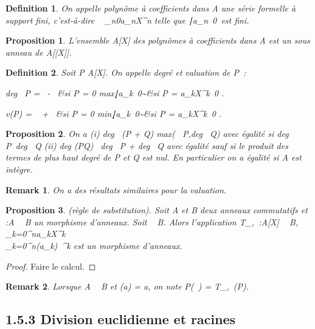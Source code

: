 \documentclass{article}
\newtheorem{definition}{Definition}[section]
\newenvironment{de}
  {\begin{definition}}
  {\end{definition}}
\newtheorem{proposition}{Proposition}[section]
\newenvironment{prop}
  {\begin{proposition}}
  {\end{proposition}}
\newtheorem{remark}{Remark}[section]
\newenvironment{rem}
  {\begin{remark}}
  {\end{remark}}
\begin{document}
\begin{de}
On appelle polynôme à coefficients dans A une série
formelle à support fini, c'est-à-dire
\sum ~
_n\geq0a_nX^n telle que
\n∣a_n\mathrel\neq~0\
est fini.
\end{de}

\begin{prop}
L'ensemble A[X] des polynômes à coefficients dans
A est un sous anneau de A[[X]].
\end{prop}

\begin{de}
Soit P \in A[X]. On appelle degré et valuation de P~:

deg~ P = \left
\ \cases -\infty~ &si P = 0
\cr
max\k∣a_k\mathrel\neq~0\~&si
P = \sum
a_kX^k\neq~0 
\right .

v(P) = \left \ \cases
+\infty~ &si P = 0 \cr
min\k∣a_k\mathrel\neq~0\~&si
P = \sum
a_kX^k\neq~0 
\right .
\end{de}

\begin{prop}
On a (i) deg~ (P + Q)
\leq max(\deg~
P,deg~ Q) avec égalité si
deg~
P\neq~deg~ Q (ii)
deg (PQ) \leq\ deg~ P
+ deg~ Q avec égalité sauf si le produit des
termes de plus haut degré de P et Q est nul. En particulier on a égalité
si A est intègre.
\end{prop}

\begin{rem}
On a des résultats similaires pour la valuation.
\end{rem}

\begin{prop}
(règle de substitution). Soit A et B deux anneaux
commutatifs et \phi:A \rightarrow~ B un morphisme d'anneaux. Soit \beta~ \in B. Alors
l'application T_\phi,\beta~:A[X] \rightarrow~ B,
\sum ~
_k=0^na_kX^k\mapsto~\\\sum
 _k=0^n\phi(a_k)\beta~^k est un morphisme
d'anneaux.
\end{prop}

\begin{proof}
Faire le calcul.
\end{proof}

\begin{rem}
Lorsque A \subset~ B et \phi(a) = a, on note P(\beta~) =
T_\phi,\beta~(P).
\end{rem}

\subsection{1.5.3 Division euclidienne et racines}
\end{document}
